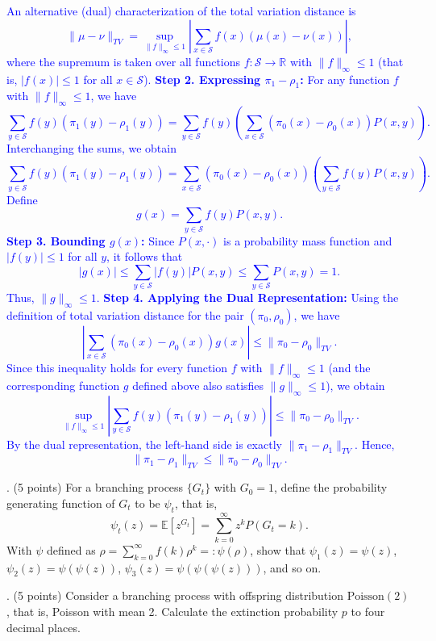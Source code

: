\documentclass{article}
\begin{document}
\textcolor{blue}{
    An alternative (dual) characterization of the total variation distance is
\[
\|\mu-\nu\|_{TV} = \sup_{\|f\|_\infty \le 1} \left| \sum_{x\in \mathcal{S}} f(x)(\mu(x)-\nu(x)) \right|,
\]
where the supremum is taken over all functions \(f:\mathcal{S}\to\mathbb{R}\) with \(\|f\|_\infty \le 1\) (that is, \(|f(x)| \le 1\) for all \(x\in \mathcal{S}\)).
\medskip
\noindent \textbf{Step 2. Expressing \(\pi_1-\rho_1\):} 
For any function \(f\) with \(\|f\|_\infty \le 1\), we have
\[
\sum_{y\in\mathcal{S}} f(y)\left(\pi_1(y)-\rho_1(y)\right) 
=\sum_{y\in\mathcal{S}} f(y) \left( \sum_{x\in\mathcal{S}} (\pi_0(x)-\rho_0(x)) P(x,y) \right).
\]
Interchanging the sums, we obtain
\[
\sum_{y\in\mathcal{S}} f(y)\left(\pi_1(y)-\rho_1(y)\right) 
=\sum_{x\in\mathcal{S}} (\pi_0(x)-\rho_0(x)) \left( \sum_{y\in\mathcal{S}} f(y)P(x,y) \right).
\]
Define
\[
g(x) = \sum_{y\in\mathcal{S}} f(y)P(x,y).
\]
\medskip
\noindent \textbf{Step 3. Bounding \(g(x)\):}
Since \(P(x,\cdot)\) is a probability mass function and \(|f(y)| \le 1\) for all \(y\), it follows that
\[
|g(x)| \le \sum_{y\in\mathcal{S}} |f(y)| P(x,y) \le \sum_{y\in\mathcal{S}} P(x,y) = 1.
\]
Thus, \(\|g\|_\infty \le 1\).
\medskip
\noindent \textbf{Step 4. Applying the Dual Representation:}
Using the definition of total variation distance for the pair \((\pi_0, \rho_0)\), we have
\[
\left|\sum_{x\in\mathcal{S}} (\pi_0(x)-\rho_0(x))g(x)\right| \le \|\pi_0-\rho_0\|_{TV}.
\]
Since this inequality holds for every function \(f\) with \(\|f\|_\infty \le 1\) (and the corresponding function \(g\) defined above also satisfies \(\|g\|_\infty \le 1\)), we obtain
\[
\sup_{\|f\|_\infty \le 1} \left|\sum_{y\in\mathcal{S}} f(y)\left(\pi_1(y)-\rho_1(y)\right)\right| \le \|\pi_0-\rho_0\|_{TV}.
\]
By the dual representation, the left-hand side is exactly \(\|\pi_1-\rho_1\|_{TV}\). Hence,
\[
\|\pi_1-\rho_1\|_{TV} \le \|\pi_0-\rho_0\|_{TV}.
\]
}

. (5 points) For a branching process $\{G_t\}$ with $G_0 = 1$, define the probability generating function of $G_t$ to be $\psi_t$, that is,
\[
\psi_t(z) = \mathbb{E}[z^{G_t}] = \sum_{k=0}^{\infty} z^k P(G_t = k).
\]
With $\psi$ defined as $\rho = \sum_{k=0}^{\infty}f(k)\rho^k =: \psi(\rho)$, show that $\psi_1(z) = \psi(z)$, $\psi_2(z) = \psi(\psi(z))$, $\psi_3(z) = \psi(\psi(\psi(z)))$, and so on.

\bigskip

. (5 points) Consider a branching process with offspring distribution $\text{Poisson}(2)$, that is, Poisson with mean 2. Calculate the extinction probability $p$ to four decimal places.
\end{document}
